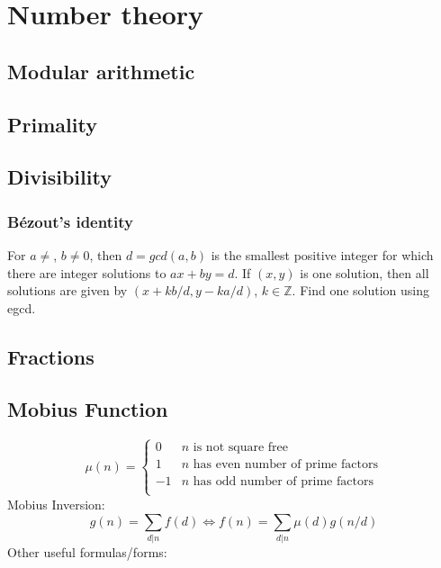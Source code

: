 \chapter{Number theory}

\section{Modular arithmetic}

\section{Primality}

\section{Divisibility}

	\subsection{Bézout's identity}
	For $a \neq $, $b \neq 0$, then $d=gcd(a,b)$ is the smallest positive integer for which there are integer solutions to $ax+by=d$. If $(x,y)$ is one solution, then all solutions are given by $\left(x+kb/d, y-ka/d\right)$, $k\in\mathbb{Z}$. Find one solution using egcd.


\section{Fractions}

\section{Mobius Function}
\[
	\mu(n) = \begin{cases} 0 & n \textrm{ is not square free}\\ 1 & n \textrm{ has even number of prime factors}\\ -1 & n \textrm{ has odd number of prime factors}\\\end{cases}
\]
  Mobius Inversion:
  \[ g(n) = \sum_{d|n} f(d) \Leftrightarrow f(n) = \sum_{d|n} \mu(d)g(n/d) \]
  Other useful formulas/forms:

